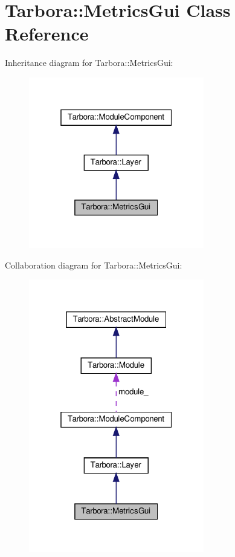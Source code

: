 \hypertarget{classTarbora_1_1MetricsGui}{}\section{Tarbora\+:\+:Metrics\+Gui Class Reference}
\label{classTarbora_1_1MetricsGui}


Inheritance diagram for Tarbora\+:\+:Metrics\+Gui\+:\nopagebreak
\begin{figure}[H]
\begin{center}
\leavevmode
\includegraphics[width=217pt]{classTarbora_1_1MetricsGui__inherit__graph}
\end{center}
\end{figure}


Collaboration diagram for Tarbora\+:\+:Metrics\+Gui\+:\nopagebreak
\begin{figure}[H]
\begin{center}
\leavevmode
\includegraphics[width=217pt]{classTarbora_1_1MetricsGui__coll__graph}
\end{center}
\end{figure}
